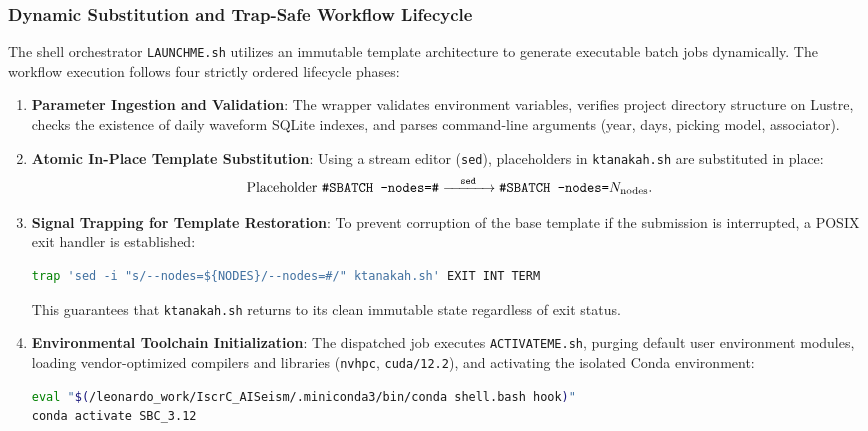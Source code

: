 \subsubsection*{Dynamic Substitution and Trap-Safe Workflow Lifecycle}
The shell orchestrator \texttt{LAUNCHME.sh} utilizes an immutable
template architecture
to generate executable batch jobs dynamically. The workflow
execution follows four strictly
ordered lifecycle phases:

\begin{enumerate}
  \item \textbf{Parameter Ingestion and Validation}: The wrapper
    validates environment variables,
    verifies project directory structure on Lustre, checks the
    existence of daily waveform
    SQLite indexes, and parses command-line arguments (year, days,
    picking model, associator).
  \item \textbf{Atomic In-Place Template Substitution}: Using a
    stream editor (\texttt{sed}),
    placeholders in \texttt{ktanakah.sh} are substituted in place:
    \begin{equation}
      \text{Placeholder } \texttt{\#SBATCH --nodes=\#}
      \xrightarrow{\quad\text{\texttt{sed}}\quad} \texttt{\#SBATCH
      --nodes=} N_{\mathrm{nodes}}.
    \end{equation}
  \item \textbf{Signal Trapping for Template Restoration}: To
    prevent corruption of the base
    template if the submission is interrupted, a POSIX exit handler
    is established:
    \begin{lstlisting}[language=bash,basicstyle=\scriptsize\ttfamily]
trap 'sed -i "s/--nodes=${NODES}/--nodes=#/" ktanakah.sh' EXIT INT TERM
    \end{lstlisting}
    This guarantees that \texttt{ktanakah.sh} returns to its clean
    immutable state regardless of
    exit status.
  \item \textbf{Environmental Toolchain Initialization}: The
    dispatched job executes
    \texttt{ACTIVATEME.sh}, purging default user environment
    modules, loading vendor-optimized
    compilers and libraries (\texttt{nvhpc}, \texttt{cuda/12.2}),
    and activating the isolated
    Conda environment:
    \begin{lstlisting}[language=bash,basicstyle=\scriptsize\ttfamily]
eval "$(/leonardo_work/IscrC_AISeism/.miniconda3/bin/conda shell.bash hook)"
conda activate SBC_3.12
    \end{lstlisting}
\end{enumerate}

